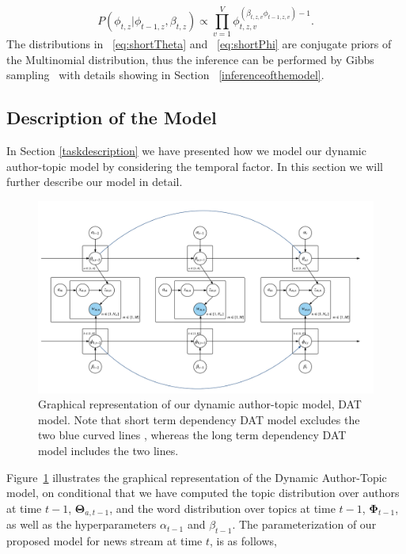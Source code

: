 \begin{equation}
\label{eq:shortPhi}
P(\phi_{t, z} | \phi_{t-1, z}, \beta_{t, z}) \propto \prod_{v=1}^V \phi_{t, z, v}^{(\beta_{t, z, v} \phi_{t-1, z, v}) -1}.
\end{equation}
The distributions in ~\eqref{eq:shortTheta} and ~\eqref{eq:shortPhi} are conjugate priors of the Multinomial distribution, thus the inference can be performed by Gibbs sampling~\cite{liu1994collapsed} with details showing in Section ~\ref{inferenceofthemodel}.
%
\subsection{Description of the Model}


In Section \ref{taskdescription} we have presented how we model our dynamic author-topic model by considering the temporal factor. In this section we will further describe our model in detail. 

\begin{figure}[h]
\centering
\includegraphics[width=1.1\textwidth]{figures/ATOT_Graphic.png}
\caption{Graphical representation of our dynamic author-topic model, DAT model. Note that short term dependency DAT model excludes the two blue curved lines , whereas the long term dependency DAT model includes the two lines.}
\label{fig:atot}
\end{figure}


Figure~\ref{fig:atot} illustrates the graphical representation of the Dynamic Author-Topic model, on conditional that we have computed the topic distribution over authors at time $t-1$, $\boldsymbol{\Theta}_{a,t-1}$, and the word distribution over topics at time $t-1$, $\boldsymbol{\Phi}_{t-1}$, as well as the hyperparameters $\alpha_{t-1}$ and  $\beta_{t-1}$. The parameterization of our proposed model for news stream  at time $t$, is as follows,

